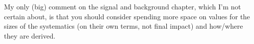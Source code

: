 My only (big) comment on the signal and background chapter, which I'm not certain about, 
is that you should consider spending more space on values for the sizes of the systematics 
(on their own terms, not final impact) and how/where they are derived.

